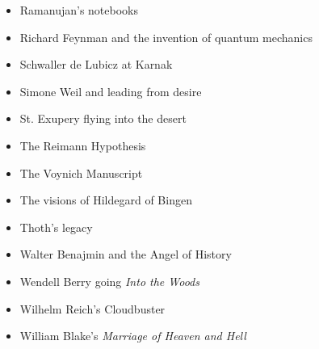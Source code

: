 \documentclass[letterpaper,oneside,11pt,draft]{memoir}
\begin{document}
\begin{itemize}
\item Ramanujan's notebooks
\item Richard Feynman and the invention of quantum mechanics
\item Schwaller de Lubicz at Karnak
\item Simone Weil and leading from desire
\item St. Exupery flying into the desert
\item The Reimann Hypothesis
\item The Voynich Manuscript
\item The visions of Hildegard of Bingen
\item Thoth's legacy
\item Walter Benajmin and the Angel of History
\item Wendell Berry going \textit{Into the Woods}
\item Wilhelm Reich's Cloudbuster
\item William Blake's \textit{Marriage of Heaven and Hell}

\end{itemize}
\end{document}
